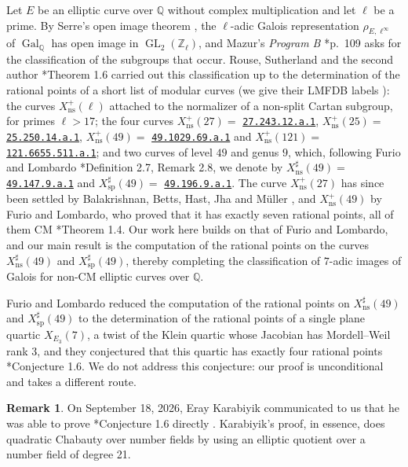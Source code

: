 \documentclass[12pt]{amsart}
\newcommand{\Q}{\mathbb{Q}}
\newcommand{\Z}{\mathbb{Z}}
\DeclareMathOperator{\ns}{ns}
\DeclareMathOperator{\spc}{sp}
\DeclareMathOperator{\Gal}{Gal}
\newcommand{\GL}{\operatorname{GL}}
\newcommand{\mclabel}[1]{\href{https://beta.lmfdb.org/ModularCurve/Q/#1}{\texttt{#1}}}
\numberwithin{equation}{section}
\theoremstyle{definition}
\newtheorem{remark}[theorem]{Remark}
\begin{document}
Let $E$ be an elliptic curve over $\Q$ without complex multiplication and let
$\ell$ be a prime. By Serre's open image theorem \cite{Serre-72}, the
$\ell$-adic Galois representation $\rho_{E,\ell^{\infty}}$ of $\Gal_{\Q}$ has open image in
$\GL_2(\Z_\ell)$, and Mazur's \emph{Program B} \cite{Mazur-77}*{p.~109} asks for
the classification of the subgroups that occur. Rouse, Sutherland and the
second author \cite{RSZB-22}*{Theorem 1.6} carried out this classification up
to the determination of the rational points of a short list of modular curves
(we give their LMFDB labels \cite{LMFDB}): the curves $X_{\ns}^{+}(\ell)$
attached to the normalizer of a non-split Cartan subgroup, for primes
$\ell > 17$; the four curves $X_{\ns}^{+}(27) =$ \mclabel{27.243.12.a.1},
$X_{\ns}^{+}(25) =$ \mclabel{25.250.14.a.1}, $X_{\ns}^{+}(49) =$
\mclabel{49.1029.69.a.1} and $X_{\ns}^{+}(121) =$ \mclabel{121.6655.511.a.1};
and two curves of level $49$ and genus $9$, which, following Furio and Lombardo
\cite{Furio--Lombardo26}*{Definition 2.7, Remark 2.8}, we denote by
$X_{\ns}^{\sharp}(49) =$ \mclabel{49.147.9.a.1} and
$X_{\spc}^{\sharp}(49) =$ \mclabel{49.196.9.a.1}. The curve $X_{\ns}^{+}(27)$
has since been settled by Balakrishnan, Betts, Hast, Jha and M\"uller
\cite{BBHJM-25}, and $X_{\ns}^{+}(49)$ by Furio and Lombardo, who proved that it
has exactly seven rational points, all of them CM
\cite{Furio--Lombardo26}*{Theorem 1.4}. Our work here builds on that of Furio
and Lombardo, and our main result is the computation of the rational points on
the curves $X_{\ns}^{\sharp}(49)$ and $X_{\spc}^{\sharp}(49)$, thereby
completing the classification of $7$-adic images of Galois for non-CM elliptic
curves over $\Q$.

Furio and Lombardo reduced the computation of the rational points on
$X_{\ns}^{\sharp}(49)$ and $X_{\spc}^{\sharp}(49)$ to the determination of the rational
points of a single plane quartic $X_{E_3}(7)$, a twist of the Klein quartic
whose Jacobian has Mordell--Weil rank $3$, and they conjectured that this
quartic has exactly four rational points \cite{Furio--Lombardo26}*{Conjecture
  1.6}. We do not address this conjecture: our proof is unconditional and takes
a different route.

\begin{remark}
  \label{remark:eray}
  On September 18, 2026, Eray Karabiyik communicated to us that he was able
  to prove
  \cite{Furio--Lombardo26}*{Conjecture
    1.6} directly \cite{Karabiyik-26}. Karabiyik's proof, in essence, does
  quadratic Chabauty over number fields by using an elliptic quotient over a
  number field of degree 21.
\end{remark}
\end{document}
